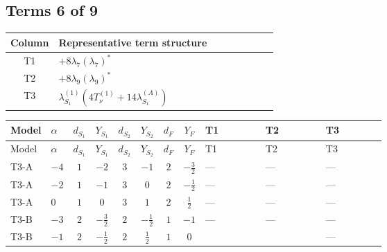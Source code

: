 \documentclass[8pt]{article}
\begin{document}
\begin{landscape}
\subsection*{Terms 6 of 9}
\begin{center}
\begin{tabular}{@{}c >{\raggedright\arraybackslash}p{0.82\linewidth}@{}}
\toprule
Column & Representative term structure \\
\midrule
T1 & \(\displaystyle +8 {\lambda_{7}} \left({\lambda_{7}}\right)^{*}\) \\
\midrule
T2 & \(\displaystyle +8 {\lambda_{9}} \left({\lambda_{9}}\right)^{*}\) \\
\midrule
T3 & \(\displaystyle {\lambda_{S_1}^{(1)}} (4 T_{\nu}^{(1)}+14 {\lambda_{S_1}^{(A)}})\) \\
\midrule
\bottomrule
\end{tabular}
\end{center}
\smallskip
\tiny
\begin{longtable}{@{}llcccccc >{\raggedright\arraybackslash}p{0.21\linewidth} >{\raggedright\arraybackslash}p{0.21\linewidth} >{\raggedright\arraybackslash}p{0.21\linewidth}@{}}
\toprule
Model & $\alpha$ & $d_{S_1}$ & $Y_{S_1}$ & $d_{S_2}$ & $Y_{S_2}$ & $d_F$ & $Y_F$ & T1 & T2 & T3 \\
\midrule
\endfirsthead
\toprule
Model & $\alpha$ & $d_{S_1}$ & $Y_{S_1}$ & $d_{S_2}$ & $Y_{S_2}$ & $d_F$ & $Y_F$ & T1 & T2 & T3 \\
\midrule
\endhead
T3-A & $-4$ & $1$ & $-2$ & $3$ & $-1$ & $2$ & $-\frac{3}{2}$ & --- & --- & --- \\
\midrule
T3-A & $-2$ & $1$ & $-1$ & $3$ & $0$ & $2$ & $-\frac{1}{2}$ & --- & --- & --- \\
\midrule
T3-A & $0$ & $1$ & $0$ & $3$ & $1$ & $2$ & $\frac{1}{2}$ & --- & --- & --- \\
\midrule
T3-B & $-3$ & $2$ & $-\frac{3}{2}$ & $2$ & $-\frac{1}{2}$ & $1$ & $-1$ & --- & --- & --- \\
\midrule
T3-B & $-1$ & $2$ & $-\frac{1}{2}$ & $2$ & $\frac{1}{2}$ & $1$ & $0$ & \scriptsize\adjustbox{max width=\linewidth}{$\begin{gathered} +8 {\lambda_{7}} \left({\lambda_{7}}\right)^{*}\end{gathered}$} & \scriptsize\adjustbox{max width=\linewidth}{$\begin{gathered} +8 {\lambda_{9}} \left({\lambda_{9}}\right)^{*}\end{gathered}$} & --- \\
\midrule

\end{longtable}
\end{landscape}
\end{document}
